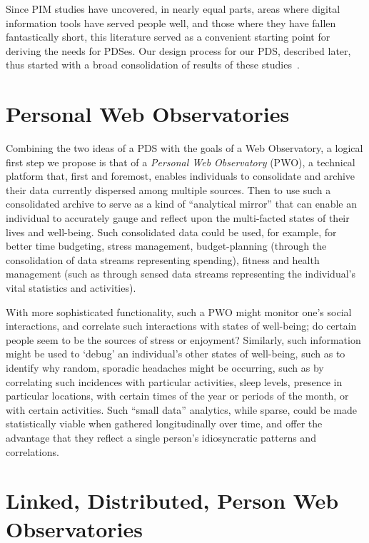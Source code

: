 \documentclass{acm_proc_article-sp}
\begin{document}
Since PIM studies have uncovered, in nearly equal parts, areas where digital information tools have served people well, and those where they have fallen fantastically short, this literature served as a convenient starting point for deriving the needs for PDSes.  Our design process for our PDS, described later, thus started with a broad consolidation of results of these studies~\cite{van2012decentralized}.  

\section{Personal Web Observatories}

Combining the two ideas of a PDS with the goals of a Web Observatory, a logical first step we propose is that of a \emph{Personal Web Observatory} (PWO), a technical platform that, first and foremost, enables individuals to consolidate and archive their data currently dispersed among multiple sources. Then to use such a consolidated archive to serve as a kind of ``analytical mirror'' that can enable an individual to accurately gauge and reflect upon the multi-facted states of their lives and well-being. Such consolidated data could be used, for example, for better time budgeting, stress management, budget-planning (through the consolidation of data streams representing spending), fitness and health management (such as through sensed data streams representing the individual's vital statistics and activities). 

With more sophisticated functionality, such a PWO might monitor one's social interactions, and correlate such interactions with states of well-being; do certain people seem to be the sources of stress or enjoyment? Similarly, such information might be used to `debug' an individual's other states of well-being, such as to identify why random, sporadic headaches might be occurring, such as by correlating such incidences with particular activities, sleep levels, presence in particular locations, with certain times of the year or periods of the month, or with certain activities. Such ``small data'' analytics, while sparse, could be made statistically viable when gathered longitudinally over time, and offer the advantage that they reflect a single person's idiosyncratic patterns and correlations.

\section{Linked, Distributed, Person Web Observatories}
\end{document}
